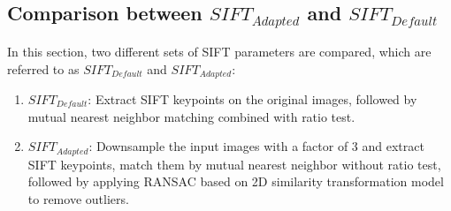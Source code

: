 \subsection{Comparison between $SIFT_{Adapted}$ and $SIFT_{Default}$}
\label{Compare2SIFTs}
In this section, two different sets of SIFT parameters are compared, which are referred to as $SIFT_{Default}$ and $SIFT_{Adapted}$:\\
\begin{enumerate}
	\item \textbf{$SIFT_{Default}$}: Extract SIFT keypoints on the original images, followed by mutual nearest neighbor matching combined with ratio test.%
	\item \textbf{$SIFT_{Adapted}$}: Downsample the input images with a factor of 3 and extract SIFT keypoints, match them by mutual nearest neighbor without ratio test, followed by applying RANSAC based on 2D similarity transformation model to remove outliers.
\end{enumerate}


